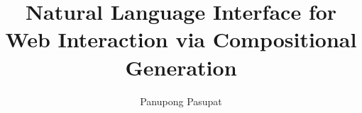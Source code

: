 \documentclass{report}
\begin{document}
\title{Natural Language Interface for Web Interaction via Compositional Generation}
\author{Panupong Pasupat}
 
\beforepreface

\afterpreface



\appendix



\end{document}
